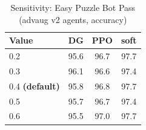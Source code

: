 \begin{table}[h]
\centering
\caption{Sensitivity: Easy Puzzle Bot Pass (advaug v2 agents, accuracy)}
\label{tab:sensitivity_easy_puzzle_bot_pass}
\begin{tabular}{lccc}
\toprule
Value & DG & PPO & soft \\
\midrule
  0.2 & 95.6 & 96.7 & 97.7 \\
  0.3 & 96.1 & 96.6 & 97.4 \\
  0.4 \textbf{(default)} & 95.8 & 96.8 & 97.7 \\
  0.5 & 95.7 & 96.7 & 97.4 \\
  0.6 & 95.5 & 97.0 & 97.7 \\
\bottomrule
\end{tabular}
\end{table}